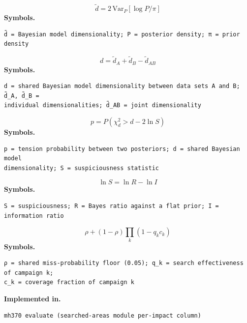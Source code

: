 \documentclass[11pt,a4paper]{article}
\begin{document}
\medskip
\begin{equation}
\tilde{d} = 2\,\mathrm{Var}_P\!\left[\log P/\pi\right]
\end{equation}
\noindent\textbf{Symbols.}
\begin{verbatim}
d̃ = Bayesian model dimensionality; P = posterior density; π = prior density
\end{verbatim}
\medskip
\begin{equation}
d = \tilde{d}_A + \tilde{d}_B - \tilde{d}_{AB}
\end{equation}
\noindent\textbf{Symbols.}
\begin{verbatim}
d = shared Bayesian model dimensionality between data sets A and B; d̃_A, d̃_B =
individual dimensionalities; d̃_AB = joint dimensionality
\end{verbatim}
\medskip
\begin{equation}
p = P(\chi^2_d > d - 2\ln S)
\end{equation}
\noindent\textbf{Symbols.}
\begin{verbatim}
p = tension probability between two posteriors; d = shared Bayesian model
dimensionality; S = suspiciousness statistic
\end{verbatim}
\medskip
\begin{equation}
\ln S = \ln R - \ln I
\end{equation}
\noindent\textbf{Symbols.}
\begin{verbatim}
S = suspiciousness; R = Bayes ratio against a flat prior; I = information ratio
\end{verbatim}
\medskip
\begin{equation}
\rho + (1-\rho)\prod_k (1 - q_k c_k)
\end{equation}
\noindent\textbf{Symbols.}
\begin{verbatim}
ρ = shared miss-probability floor (0.05); q_k = search effectiveness of campaign k;
c_k = coverage fraction of campaign k
\end{verbatim}
\noindent\textbf{Implemented in.}
\begin{verbatim}
mh370 evaluate (searched-areas module per-impact column)
\end{verbatim}
\medskip
\end{document}
